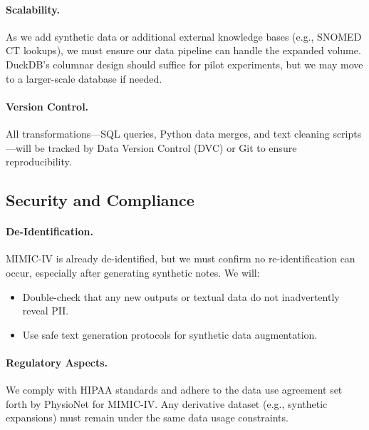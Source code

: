 \paragraph{Scalability.}
As we add synthetic data or additional external knowledge bases (e.g., SNOMED CT lookups), we must ensure our data pipeline can handle the expanded volume. DuckDB’s columnar design should suffice for pilot experiments, but we may move to a larger-scale database if needed.

\paragraph{Version Control.}
All transformations—SQL queries, Python data merges, and text cleaning scripts—will be tracked by Data Version Control (DVC) or Git to ensure reproducibility.

\subsection{Security and Compliance}

\paragraph{De-Identification.}
MIMIC-IV is already de-identified, but we must confirm no re-identification can occur, especially after generating synthetic notes. We will:
\begin{itemize}
    \item Double-check that any new outputs or textual data do not inadvertently reveal PII.
    \item Use safe text generation protocols for synthetic data augmentation.
\end{itemize}

\paragraph{Regulatory Aspects.}
We comply with HIPAA standards and adhere to the data use agreement set forth by PhysioNet for MIMIC-IV. Any derivative dataset (e.g., synthetic expansions) must remain under the same data usage constraints.

